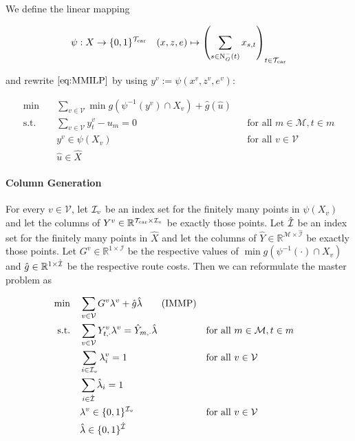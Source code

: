 We define the linear mapping

\begin{align*}
	\psi:X\to\{0,1\}^{\mathcal{T}_{\operatorname{car}}} && (x,z,e)\mapsto\left(\sum_{s\in\operatorname{N}_G^-(t)}x_{s,t}\right)_{t\in\mathcal{T}_{\operatorname{car}}}
\end{align*}

and rewrite $\eqref{eq:MMILP}$ by using $y^v:=\psi\left(x^v,z^v,e^v\right)$:

\begin{align*}
	\min \quad & \sum_{v\in\mathcal{V}}\min g\left(\psi^{-1}\left(y^v\right)\cap X_v\right) + \hat{g}\left(\hat{u}\right) \\
	\text{s.t.} \quad & \sum_{v\in\mathcal{V}}y^v_t - u_m = 0 && \text{for all } m\in\mathcal{M},t\in m \\
	& y^v\in \psi\left(X_v\right) && \text{for all } v\in\mathcal{V} \\
	& \hat{u}\in\hat{X}
\end{align*}

\paragraph{Column Generation} \parfill

For every $v\in\mathcal{V}$, let $\mathcal{I}_v$ be an index set for the finitely many points in $\psi\left(X_v\right)$ and let the columns of $Y^v\in\mathbb{R}^{\mathcal{T}_{\operatorname{car}}\times\mathcal{I}_v}$ be exactly those points. Let $\hat{\mathcal{I}}$ be an index set for the finitely many points in $\hat{X}$ and let the columns of $\hat{Y}\in\mathbb{R}^{\mathcal{M}\times\hat{\mathcal{I}}}$ be exactly those points. Let $G^v\in\mathbb{R}^{1\times\mathcal{I}}$ be the respective values of $\min g\left(\psi^{-1}(\cdot)\cap X_v\right)$ and $\hat{g}\in\mathbb{R}^{1\times\hat{\mathcal{I}}}$ be the respective route costs. Then we can reformulate the master problem as

\begin{align*}
	\min \quad & \sum_{v\in\mathcal{V}}G^v\lambda^v + \hat{g}\hat{\lambda} \tag{IMMP} \\
	\text{s.t.} \quad & \sum_{v\in\mathcal{V}} Y^v_{t,\cdot}\lambda^v = \hat{Y}_{m,\cdot}\hat{\lambda} && \text{for all } m\in\mathcal{M},t\in m \\
	& \sum_{i\in\mathcal{I}_v}\lambda_i^v=1 && \text{for all } v\in\mathcal{V}\\
	& \sum_{i\in\hat{\mathcal{I}}}\hat{\lambda}_i= 1 \\
	& \lambda^v\in\{0,1\}^{\mathcal{I}_v} && \text{for all } v\in\mathcal{V} \\
	& \hat{\lambda}\in\{0,1\}^{\hat{\mathcal{I}}}
\end{align*}

